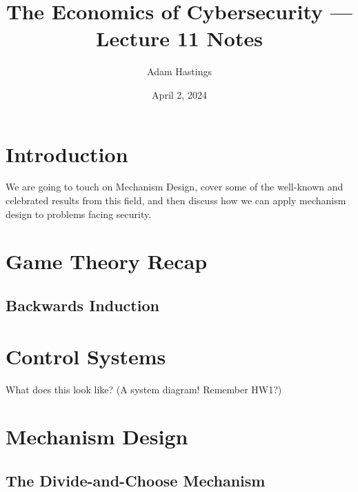 \documentclass[11pt]{article}
\title{The Economics of Cybersecurity --- Lecture 11 Notes}
\date{April 2, 2024}
\author{Adam Hastings}
\begin{document}
\maketitle

\section{Introduction}

We are going to touch on Mechanism Design, cover some of the well-known and celebrated results from this field, and then discuss how we can apply mechanism design to problems facing security.

\section{Game Theory Recap}

\subsection{Backwards Induction}



\section{Control Systems}

What does this look like? (A system diagram! Remember HW1?)

\section{Mechanism Design}

\subsection{The Divide-and-Choose Mechanism}
\end{document}
